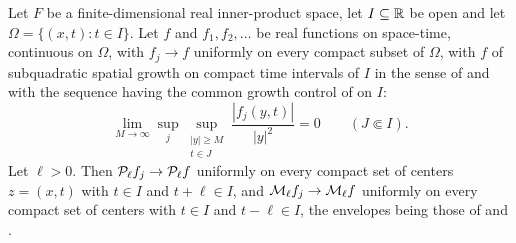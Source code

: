 \begin{lemma}
Let $F$ be a finite-dimensional real inner-product space, let $I\subseteq\mathbb{R}$ be
open and let $\Omega=\{(x,t):t\in I\}$. Let $f$ and $f_1,f_2,\ldots$ be real
functions on space-time, continuous on $\Omega$, with $f_j\to f$ uniformly on
every compact subset of $\Omega$, with $f$ of subquadratic spatial growth on
compact time intervals of $I$ in the sense of  and
with the sequence having the common growth control of
 on $I$:
\[
  \lim_{M\to\infty}\sup_j\sup_{\substack{|y|\ge M\\t\in J}}
      \frac{|f_j(y,t)|}{|y|^2}=0\qquad(J\Subset I).
\]
Let $\ell>0$. Then $\mathcal{P}_\ell f_j\to\mathcal{P}_\ell f$ uniformly on every compact
set of centers $z=(x,t)$ with $t\in I$ and $t+\ell\in I$, and
$\mathcal{M}_\ell f_j\to\mathcal{M}_\ell f$ uniformly on every compact set of centers with
$t\in I$ and $t-\ell\in I$, the envelopes being those of  and
.
\end{lemma}
